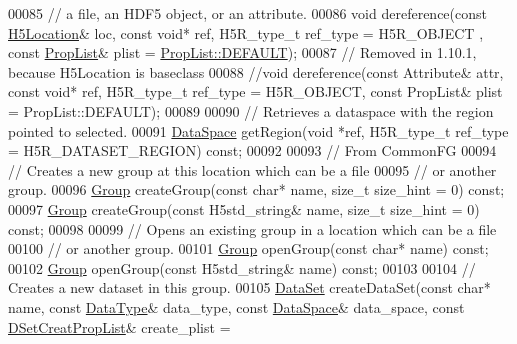 \begin{DoxyCode}
00085         \textcolor{comment}{// a file, an HDF5 object, or an attribute.}
00086         \textcolor{keywordtype}{void} dereference(\textcolor{keyword}{const} \hyperlink{class_h5_1_1_h5_location}{H5Location}& loc, \textcolor{keyword}{const} \textcolor{keywordtype}{void}* ref, H5R\_type\_t ref\_type = H5R\_OBJECT
      , \textcolor{keyword}{const} \hyperlink{class_h5_1_1_prop_list}{PropList}& plist = \hyperlink{class_h5_1_1_prop_list_ae52af66ce82af0ea7e6dc57148c56241}{PropList::DEFAULT});
00087         \textcolor{comment}{// Removed in 1.10.1, because H5Location is baseclass}
00088         \textcolor{comment}{//void dereference(const Attribute& attr, const void* ref, H5R\_type\_t ref\_type = H5R\_OBJECT, const
       PropList& plist = PropList::DEFAULT);}
00089 
00090         \textcolor{comment}{// Retrieves a dataspace with the region pointed to selected.}
00091         \hyperlink{class_h5_1_1_data_space}{DataSpace} getRegion(\textcolor{keywordtype}{void} *ref, H5R\_type\_t ref\_type = H5R\_DATASET\_REGION) \textcolor{keyword}{const};
00092 
00093 \textcolor{comment}{// From CommonFG}
00094         \textcolor{comment}{// Creates a new group at this location which can be a file}
00095         \textcolor{comment}{// or another group.}
00096         \hyperlink{class_h5_1_1_group}{Group} createGroup(\textcolor{keyword}{const} \textcolor{keywordtype}{char}* name, \textcolor{keywordtype}{size\_t} size\_hint = 0) \textcolor{keyword}{const};
00097         \hyperlink{class_h5_1_1_group}{Group} createGroup(\textcolor{keyword}{const} H5std\_string& name, \textcolor{keywordtype}{size\_t} size\_hint = 0) \textcolor{keyword}{const};
00098 
00099         \textcolor{comment}{// Opens an existing group in a location which can be a file}
00100         \textcolor{comment}{// or another group.}
00101         \hyperlink{class_h5_1_1_group}{Group} openGroup(\textcolor{keyword}{const} \textcolor{keywordtype}{char}* name) \textcolor{keyword}{const};
00102         \hyperlink{class_h5_1_1_group}{Group} openGroup(\textcolor{keyword}{const} H5std\_string& name) \textcolor{keyword}{const};
00103 
00104         \textcolor{comment}{// Creates a new dataset in this group.}
00105         \hyperlink{class_h5_1_1_data_set}{DataSet} createDataSet(\textcolor{keyword}{const} \textcolor{keywordtype}{char}* name, \textcolor{keyword}{const} \hyperlink{class_h5_1_1_data_type}{DataType}& data\_type, \textcolor{keyword}{const} 
      \hyperlink{class_h5_1_1_data_space}{DataSpace}& data\_space, \textcolor{keyword}{const} \hyperlink{class_h5_1_1_d_set_creat_prop_list}{DSetCreatPropList}& create\_plist = 

\end{DoxyCode}
